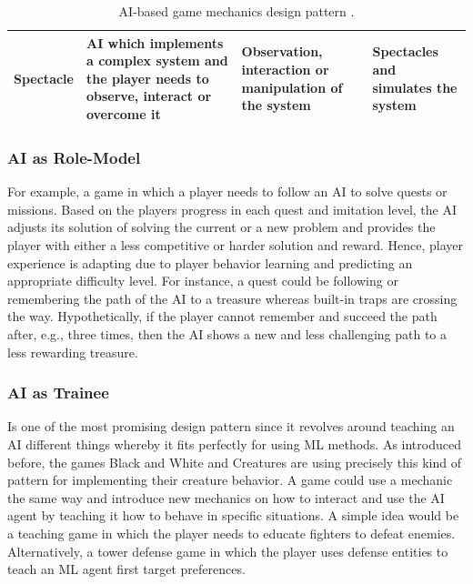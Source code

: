 \documentclass[MGS,Master,english]{twbook}%
\begin{document}
\begin{table}[!ht]
{\begin{tabular}{|p{2.1cm}||p{8cm}|p{4cm}|p{4cm}|}
			\textbf{Spectacle} & \ac{AI} which implements a complex system and the player needs to observe, interact or overcome it & Observation, interaction or manipulation of the system & Spectacles and simulates the system \\ \hline
		\end{tabular}%
	}
	\caption{\ac{AI}-based game mechanics design pattern \protect\cite{ai::aiBasedGameDesignPattern}.}
	\label{AI-basedMechanicsDesignPattern}
\end{table}

\subsubsection{\acl{AI} as Role-Model}
For example, a game in which a player needs to follow an \ac{AI} to solve quests or missions. Based on the players progress in each quest and imitation level, the \ac{AI} adjusts its solution of solving the current or a new problem and provides the player with either a less competitive or harder solution and reward. Hence, player experience is adapting due to player behavior learning and predicting an appropriate difficulty level. For instance, a quest could be following or remembering the path of the \ac{AI} to a treasure whereas built-in traps are crossing the way. Hypothetically, if the player cannot remember and succeed the path after, e.g., three times, then the \ac{AI} shows a new and less challenging path to a less rewarding treasure.

\subsubsection{\acl{AI} as Trainee}
Is one of the most promising design pattern since it revolves around teaching an \ac{AI} different things whereby it fits perfectly for using \ac{ML} methods. As introduced before, the games Black and White and Creatures are using precisely this kind of pattern for implementing their creature behavior. A game could use a mechanic the same way and introduce new mechanics on how to interact and use the \ac{AI} agent by teaching it how to behave in specific situations. A simple idea would be a teaching game in which the player needs to educate fighters to defeat enemies. Alternatively, a tower defense game in which the player uses defense entities to teach an \ac{ML} agent first target preferences.
	
\end{document}
